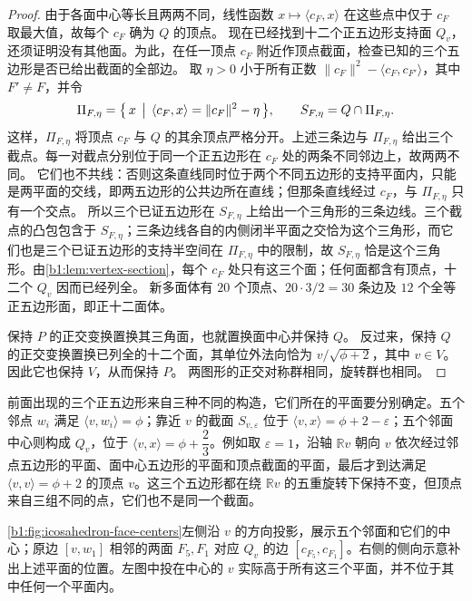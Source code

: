 \begin{proof}
	由于各面中心等长且两两不同，线性函数 \(x\mapsto\langle c_F,x\rangle\) 在这些点中仅于 \(c_F\) 取最大值，故每个 \(c_F\) 确为 \(Q\) 的顶点。 现在已经找到十二个正五边形支持面 \(Q_v\)，还须证明没有其他面。为此，在任一顶点 \(c_F\) 附近作顶点截面，检查已知的三个五边形是否已给出截面的全部边。 取 \(\eta>0\) 小于所有正数 \(\lVert c_F\rVert^2-\langle c_F,c_{F'}\rangle\)，其中 \(F'\ne F\)，并令
	\[
		\Pi_{F,\eta} =\bigl\{\,x\,\bigm|\,\langle c_F,x\rangle=\lVert c_F\rVert^2-\eta\,\bigr\}, \qquad S_{F,\eta}=Q\cap\Pi_{F,\eta}.
	\]
	这样，\(\Pi_{F,\eta}\) 将顶点 \(c_F\) 与 \(Q\) 的其余顶点严格分开。上述三条边与 \(\Pi_{F,\eta}\) 给出三个截点。每一对截点分别位于同一个正五边形在 \(c_F\) 处的两条不同邻边上，故两两不同。 它们也不共线：否则这条直线同时位于两个不同五边形的支持平面内，只能是两平面的交线，即两五边形的公共边所在直线；但那条直线经过 \(c_F\)，与 \(\Pi_{F,\eta}\) 只有一个交点。 所以三个已证五边形在 \(S_{F,\eta}\) 上给出一个三角形的三条边线。三个截点的凸包包含于 \(S_{F,\eta}\)；三条边线各自的内侧闭半平面之交恰为这个三角形，而它们也是三个已证五边形的支持半空间在 \(\Pi_{F,\eta}\) 中的限制，故 \(S_{F,\eta}\) 恰是这个三角形。由\cref{b1:lem:vertex-section}，每个 \(c_F\) 处只有这三个面；任何面都含有顶点，十二个 \(Q_v\) 因而已经列全。 新多面体有 \(20\) 个顶点、\(20\cdot3/2=30\) 条边及 \(12\) 个全等正五边形面，即正十二面体。

	保持 \(P\) 的正交变换置换其三角面，也就置换面中心并保持 \(Q\)。 反过来，保持 \(Q\) 的正交变换置换已列全的十二个面，其单位外法向恰为 \(v/\sqrt{\phi+2}\)，其中 \(v\in V\)。因此它也保持 \(V\)，从而保持 \(P\)。 两图形的正交对称群相同，旋转群也相同。
\end{proof}

前面出现的三个正五边形来自三种不同的构造，它们所在的平面要分别确定。五个邻点 \(w_i\) 满足 \(\langle v,w_i\rangle=\phi\)；靠近 \(v\) 的截面 \(S_{v,\varepsilon}\) 位于 \(\langle v,x\rangle=\phi+2-\varepsilon\)；五个邻面中心则构成 \(Q_v\)，位于 \(\langle v,x\rangle=\phi+\dfrac23\)。例如取 \(\varepsilon=1\)，沿轴 \(\mathbb Rv\) 朝向 \(v\) 依次经过邻点五边形的平面、面中心五边形的平面和顶点截面的平面，最后才到达满足 \(\langle v,v\rangle=\phi+2\) 的顶点 \(v\)。这三个五边形都在绕 \(\mathbb Rv\) 的五重旋转下保持不变，但顶点来自三组不同的点，它们也不是同一个截面。

\ProseParagraphBreak
\cref{b1:fig:icosahedron-face-centers}左侧沿 \(v\) 的方向投影，展示五个邻面和它们的中心；原边 \([v,w_1]\) 相邻的两面 \(F_5,F_1\) 对应 \(Q_v\) 的边 \([c_{F_5},c_{F_1}]\)。右侧的侧向示意补出上述平面的位置。左图中投在中心的 \(v\) 实际高于所有这三个平面，并不位于其中任何一个平面内。


